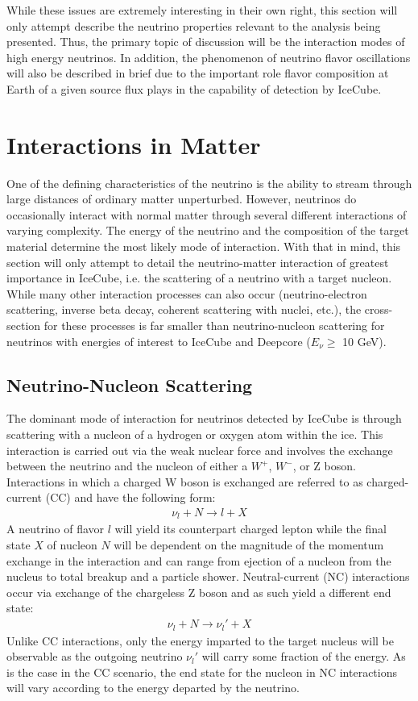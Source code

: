 \documentclass{gatech-thesis}
\begin{document}
While these issues are extremely interesting in their own right, this section will only attempt describe the neutrino properties relevant to the analysis being presented. Thus, the primary topic of discussion will be the interaction modes of high energy neutrinos. In addition, the phenomenon of neutrino flavor oscillations will also be described in brief due to the important role flavor composition at Earth of a given source flux plays in the capability of detection by IceCube.

\section{Interactions in Matter}
One of the defining characteristics of the neutrino is the ability to stream through large distances of ordinary matter unperturbed. However, neutrinos do occasionally interact with normal matter through several different interactions of varying complexity. The energy of the neutrino and the composition of the target material determine the most likely mode of interaction. With that in mind, this section will only attempt to detail the neutrino-matter interaction of greatest importance in IceCube, i.e. the scattering of a neutrino with a target nucleon. While many other interaction processes can also occur (neutrino-electron scattering, inverse beta decay, coherent scattering with nuclei, etc.), the cross-section for these processes is far smaller than neutrino-nucleon scattering for neutrinos with energies of interest to IceCube and Deepcore ($E_{\nu} \geq$ 10 GeV).

\subsection{Neutrino-Nucleon Scattering}

The dominant mode of interaction for neutrinos detected by IceCube is through scattering with a nucleon of a hydrogen or oxygen atom within the ice. This interaction is carried out via the weak nuclear force and involves the exchange between the neutrino and the nucleon of either a $W^{+}$, $W^{-}$, or Z boson. Interactions in which a charged W boson is exchanged are referred to as charged-current (CC) and have the following form:
\begin{eqnarray}
\nu_{l} + N \rightarrow l + X
\end{eqnarray}
A neutrino of flavor $l$ will yield its counterpart charged lepton while the final state $X$ of nucleon $N$ will be dependent on the magnitude of the momentum exchange in the interaction and can range from ejection of a nucleon from the nucleus to total breakup and a particle shower. Neutral-current (NC) interactions occur via exchange of the chargeless Z boson and as such yield a different end state:
\begin{eqnarray}
\nu_{l} + N \rightarrow \nu_{l}' + X
\end{eqnarray}
Unlike CC interactions, only the energy imparted to the target nucleus will be observable as the outgoing neutrino $\nu_{l}'$ will carry some fraction of the energy. As is the case in the CC scenario, the end state for the nucleon in NC interactions will vary according to the energy departed by the neutrino.
\end{document}
